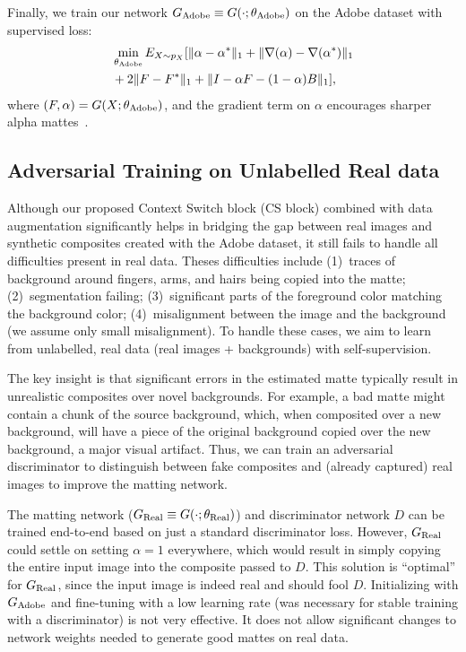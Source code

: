 \documentclass[10pt,twocolumn,letterpaper]{article}
\begin{document}
Finally, we train our network $G_{\rm Adobe} \equiv G(\cdot;\theta_{\rm Adobe})$ on the Adobe dataset with supervised loss:
\vspace{-2mm}
\begin{equation}
\label{eq:syn}
\begin{split}
&\min_{\theta_{\rm Adobe}} E_{X \sim p_{X}} [\|\alpha-\alpha^*\|_1 + \|\nabla (\alpha)-\nabla (\alpha^*)\|_1  \\
 &+ 2\|F-F^*\|_1  + \| I - \alpha F - (1-\alpha) B\|_1],
\end{split}
\end{equation}
where $(F,\alpha) = G(X;\theta_{\rm Adobe})$, and the gradient term on $\alpha$ encourages sharper alpha mattes~\cite{zhang2019late}. 



\subsection{Adversarial Training on Unlabelled Real data}
\label{sec:self_sup_train}
Although our proposed Context Switch block (CS block) combined with  data augmentation significantly helps in bridging the gap between real images and synthetic composites created with the Adobe dataset, it still fails to handle all difficulties present in real data. Theses difficulties include (1)~traces of background around fingers, arms, and hairs being copied into the matte; (2)~segmentation failing; (3)~significant parts of the foreground color matching the background color; (4)~misalignment between the image and the background (we assume only small misalignment). To handle these cases, we aim to learn from unlabelled, real data (real images + backgrounds) with self-supervision.

The key insight is that significant errors in the estimated matte typically result in unrealistic composites over novel backgrounds.  For example, a bad matte might contain a chunk of the source background, which, when composited over a new background, will have a piece of the original background copied over the new background, a major visual artifact.  Thus, we can train an adversarial discriminator to distinguish between fake composites and (already captured) real images to improve the matting network.

The matting network ($G_{\rm Real} \equiv G(\cdot;\theta_{\rm Real})$) and discriminator  network $D$ can be trained end-to-end based on just a standard discriminator loss.  However, $G_{\rm Real}$ could settle on setting $\alpha = 1$ everywhere, which would result in simply copying the entire input image into the composite passed to $D$.  This solution is ``optimal'' for $G_{\rm Real}$, since the input image is indeed real and should fool $D$.  Initializing with $G_{\rm Adobe}$ and fine-tuning with a low learning rate (was necessary for stable training with a discriminator) is not very effective. It does not allow significant changes to network weights needed to generate good mattes on real data.
\end{document}
